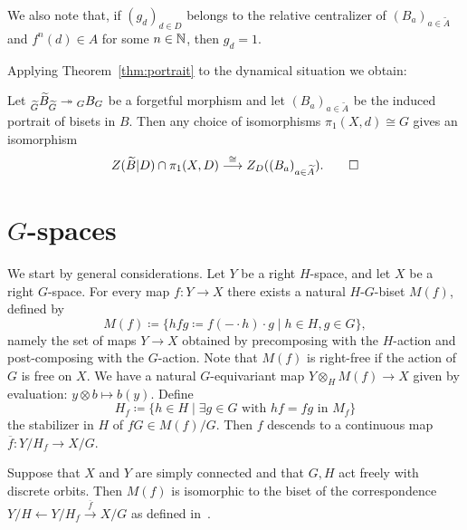 \documentclass{amsart}
\newcommand\wtA{{\widetilde A}}
\newcommand\wtB{{\widetilde B}}
\newcommand\wtG{{\widetilde G}}
\begin{document}
We also note that, if $(g_d)_{d\in D}$ belongs to the relative
centralizer of $(B_a)_{a\in\wtA}$ and $f^n(d)\in A$ for some
$n\in{\mathbb N}$, then $g_d=1$.

\noindent Applying Theorem~\ref{thm:portrait} to the dynamical
situation we obtain:
\begin{prop}\pushQED{\qed}
  Let
  $\subscript{\wtG}{\wtB}_{\wtG}\twoheadrightarrow
  \subscript G B_G$ be a forgetful morphism and let
  $(B_a)_{a\in\wtA}$ be the induced portrait of bisets in
  $B$. Then any choice of isomorphisms $\pi_1(X,d)\cong G$ gives an isomorphism
  \[Z(\wtB|D) \cap \pi_1(X,D)\stackrel\cong\longrightarrow Z_D((B_a)_{a\in \wtA}).\qedhere\]
\end{prop}

\section{$G$-spaces}
We start by general considerations.  Let $Y$ be a right $H$-space, and
let $X$ be a right $G$-space. For every map $f\colon Y\to X$ there
exists a natural $H$-$G$-biset $M(f)$, defined by
\begin{equation}\label{eq:B(ftilde)}
  M(f)\coloneqq\{h f g\coloneqq f({-}\cdot h)\cdot g\mid h\in H,g\in G\},
\end{equation}
namely the set of maps $Y\to X$ obtained by precomposing with the
$H$-action and post-composing with the $G$-action. Note that $M(f)$ is
right-free if the action of $G$ is free on $X$. We have a natural
$G$-equivariant map $Y\otimes_H M(f)\to X$ given by evaluation:
$y\otimes b\mapsto b(y)$.  Define
\[H_f\coloneqq \{h\in H\mid \exists g\in G\text{ with $h f =f g$ in }M_f\}
\]
the stabilizer in $H$ of $f G\in M(f)/G$. Then $f$ descends to a
continuous map $\overline f\colon Y/H_f\to X/G$.
\begin{lem}\label{lem:MCB vs B}
  Suppose that $X$ and $Y$ are simply connected and that $G,H$ act
  freely with discrete orbits. Then $M(f)$ is isomorphic to the biset
  of the correspondence
  $Y/H \leftarrow Y/H_f\overset{\overline f}\to X/G$ as defined
  in~\cite{bartholdi-dudko:bc1}.
\end{lem}
\end{document}
